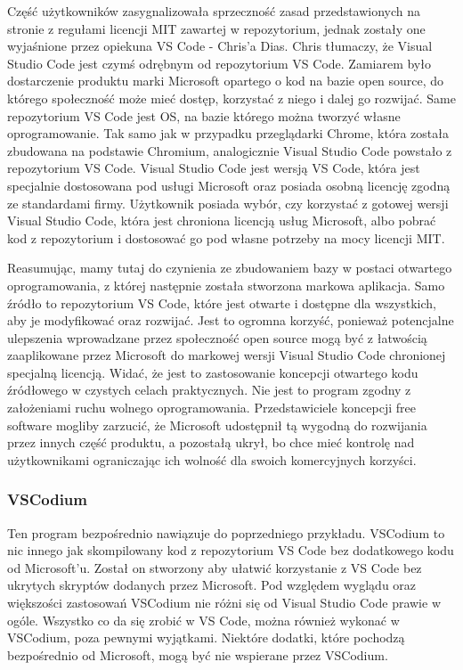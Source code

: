 \documentclass{article}
\begin{document}
Część użytkowników zasygnalizowała sprzeczność zasad przedstawionych na stronie z regułami licencji MIT zawartej w repozytorium, jednak zostały one wyjaśnione przez opiekuna VS Code - Chris'a Dias. Chris tłumaczy, że Visual Studio Code jest czymś odrębnym od repozytorium VS Code. Zamiarem było dostarczenie produktu marki Microsoft opartego o kod na bazie open source, do którego społeczność może mieć dostęp, korzystać z niego i dalej go rozwijać. Same repozytorium VS Code jest OS, na bazie którego można tworzyć własne oprogramowanie. Tak samo jak w przypadku przeglądarki Chrome, która została zbudowana na podstawie Chromium, analogicznie Visual Studio Code powstało z repozytorium VS Code. Visual Studio Code jest wersją VS Code, która jest specjalnie dostosowana pod usługi Microsoft oraz posiada osobną licencję zgodną ze standardami firmy. Użytkownik posiada wybór, czy korzystać z gotowej wersji Visual Studio Code, która jest chroniona licencją usług Microsoft, albo pobrać kod z repozytorium i dostosować go pod własne potrzeby na mocy licencji MIT\cite{vscode.issues}.

Reasumując, mamy tutaj do czynienia ze zbudowaniem bazy w postaci otwartego oprogramowania, z której następnie została stworzona markowa aplikacja. Samo źródło to repozytorium VS Code, które jest otwarte i dostępne dla wszystkich, aby je modyfikować oraz rozwijać. Jest to ogromna korzyść, ponieważ potencjalne ulepszenia wprowadzane przez społeczność open source mogą być z łatwością zaaplikowane przez Microsoft do markowej wersji Visual Studio Code chronionej specjalną licencją. Widać, że jest to zastosowanie koncepcji otwartego kodu źródłowego w czystych celach praktycznych. Nie jest to program zgodny z założeniami ruchu wolnego oprogramowania. Przedstawiciele koncepcji free software mogliby zarzucić, że Microsoft udostępnił tą wygodną do rozwijania przez innych część produktu, a pozostałą ukrył, bo chce mieć kontrolę nad użytkownikami ograniczając ich wolność dla swoich komercyjnych korzyści.

\subsubsection{VSCodium}

Ten program bezpośrednio nawiązuje do poprzedniego przykładu. VSCodium to nic innego jak skompilowany kod z repozytorium VS Code bez dodatkowego kodu od Microsoft'u. Został on stworzony aby ułatwić korzystanie z VS Code bez ukrytych skryptów dodanych przez Microsoft. Pod względem wyglądu oraz większości zastosowań VSCodium nie różni się od Visual Studio Code prawie w ogóle. Wszystko co da się zrobić w VS Code, można również wykonać w VSCodium, poza pewnymi wyjątkami. Niektóre dodatki, które pochodzą bezpośrednio od Microsoft, mogą być nie wspierane przez VSCodium\cite{vscodium.article}.
\end{document}
